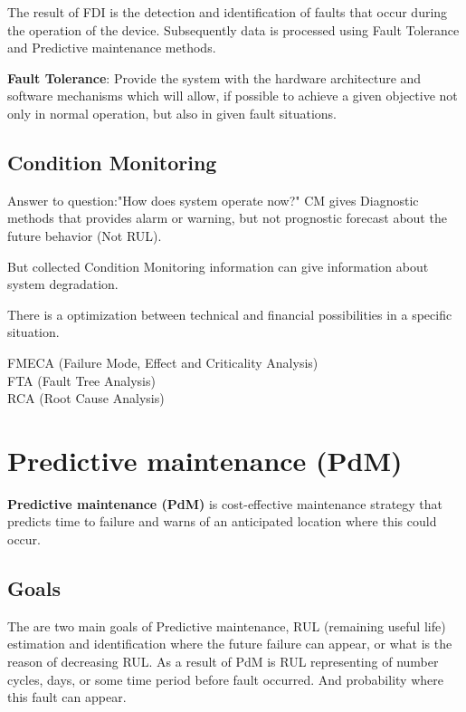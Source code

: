 The result of FDI is the detection and identification of faults that occur
during the operation of the device. Subsequently data is processed using
Fault Tolerance and Predictive maintenance methods.

\textbf{Fault Tolerance}: Provide the system with the hardware architecture and
  software mechanisms which will allow, if possible to achieve a given
  objective not only in normal operation, but also in given fault
  situations.


\subsection{Condition Monitoring}
Answer to question:"How does system operate now?"
CM gives Diagnostic methods that provides alarm or warning, but not
prognostic forecast about the future behavior (Not RUL).

But collected Condition Monitoring information can give information about
system degradation.


There is a optimization between technical and financial possibilities in a
specific situation.

FMECA (Failure Mode, Effect and Criticality Analysis) \\
FTA (Fault Tree Analysis) \\
RCA (Root Cause Analysis) \\


% 


\section{Predictive maintenance (PdM)}
\textbf{Predictive maintenance (PdM)} is cost-effective maintenance strategy that
predicts time to failure and warns of an anticipated location where this
could occur.

\subsection{Goals}
The are two main goals of Predictive maintenance, RUL (remaining useful
life) estimation and identification where the future failure can appear, or what is
the reason of decreasing RUL. 
As a result of PdM is RUL representing of number cycles, days, or some time
period before fault occurred. And probability where this fault can appear.

